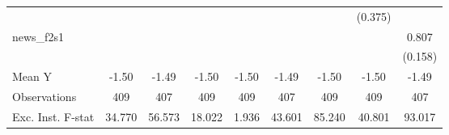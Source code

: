 {\begin{tabular}{l*{8}{c}}
            &                     &                     &                     &                     &                     &                     &     (0.375)         &                     \\
\addlinespace
news\_f2s1   &                     &                     &                     &                     &                     &                     &                     &       0.807\sym{***}\\
            &                     &                     &                     &                     &                     &                     &                     &     (0.158)         \\
\midrule
Mean Y      &       -1.50         &       -1.49         &       -1.50         &       -1.50         &       -1.49         &       -1.50         &       -1.50         &       -1.49         \\
Observations&         409         &         407         &         409         &         409         &         407         &         409         &         409         &         407         \\
Exc. Inst. F-stat&      34.770         &      56.573         &      18.022         &       1.936         &      43.601         &      85.240         &      40.801         &      93.017         \\
\bottomrule
\end{tabular}
}
